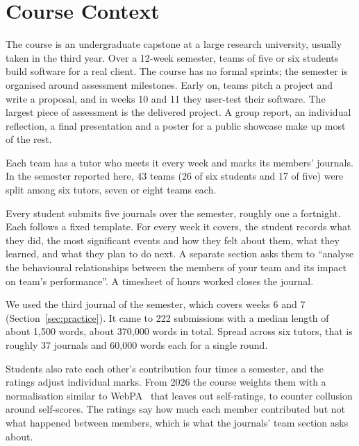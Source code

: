 \section{Course Context}
\label{sec:context}

The course is an undergraduate capstone at a large research university, usually taken in
the third year. Over a
12-week semester, teams of five or six students build software for a real client. The
course has no formal sprints; the semester is organised around assessment milestones.
Early on, teams pitch a project and write a proposal, and in weeks 10 and 11 they
user-test their software. The largest piece of assessment is the delivered
project. A group report, an individual reflection, a final presentation and a poster for a
public showcase make up most of the rest.

Each team has a tutor who meets it every week and marks its members' journals. In the
semester reported here, 43 teams (26 of six students and 17 of five) were split among six
tutors, seven or eight teams each.

Every student submits five journals over the semester, roughly one a fortnight. Each
follows a fixed template. For every week it covers, the student records what they did,
the most significant events and how they felt about them, what they learned, and what they
plan to do next. A separate section asks them to ``analyse the behavioural relationships
between the members of your team and its impact on team's performance''. A timesheet of
hours worked closes the journal.

We used the third journal of the semester, which covers weeks 6 and 7
(Section~\ref{sec:practice}). It came to 222 submissions with a median length of about
1,500 words, about 370,000 words in total. Spread across six tutors, that is roughly 37
journals and 60,000 words each for a single round.

Students also rate each other's contribution four times a semester, and the ratings adjust
individual marks. From 2026 the course weights them with a normalisation similar to
WebPA~\cite{loddington2009webpa} that leaves out self-ratings, to counter collusion
around self-scores. The ratings say how much each member contributed but not what
happened between members, which is what the journals' team section asks about.
